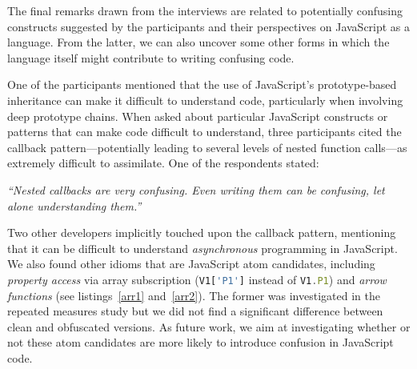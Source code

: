 
The final remarks drawn from the interviews are related to potentially confusing constructs suggested by the participants and their perspectives on JavaScript as a language. From the latter, we can also uncover some other forms in which the language itself might contribute to writing confusing code.

One of the participants mentioned that the use of JavaScript's prototype-based inheritance can make it difficult to understand code, particularly when involving deep prototype chains.
When asked about particular JavaScript constructs or patterns that can make code difficult to understand, three participants cited the callback pattern---potentially leading to several levels of nested function calls---as extremely difficult to assimilate. One of the respondents stated:

\begin{mq}
\emph{``Nested callbacks are very confusing. Even writing them can be confusing, let alone understanding them.''}
\end{mq}

Two other developers implicitly touched upon the callback pattern, mentioning that it can be difficult to understand \emph{asynchronous} programming in JavaScript.
We also found other idioms that are JavaScript atom candidates, including
\emph{property access} via array subscription (\lstinline[language=javascript]{V1['P1']} instead of \lstinline[language=javascript]{V1.P1}) and \emph{arrow functions} (see listings~\ref{arr1} and~\ref{arr2}). The former was investigated in the repeated measures study but we did not find a significant difference between clean and obfuscated versions. As future work, we aim at investigating whether or not these atom candidates are more likely to introduce confusion in JavaScript code.

